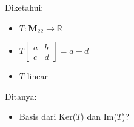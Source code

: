 \documentclass[12pt, a4paper]{scrartcl}
\begin{document}
\begin{enumerate}
\begin{enumerate}
            Diketahui:
            \begin{itemize}
                \item[] $T : \textbf{M}_{22} \to \mathbb{R} $\item[]$ T \begin{bmatrix}
                a & b\\
                c & d
                \end{bmatrix} = a + d$\item[]$T$ linear
            \end{itemize}

            Ditanya:
            \begin{itemize}
                \item Basis dari Ker($T$) dan Im($T$)?
            \end{itemize}
            

\end{enumerate}
\end{enumerate}
\end{document}
